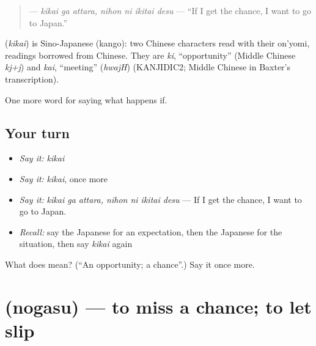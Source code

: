 \begin{quote}
\textbf{  } — \emph{kikai ga attara, nihon ni ikitai desu} — \textquotedblleft{}If I get the chance, I want to go to Japan.\textquotedblright{}
\end{quote}

\begin{cousinweb}
\textbf{} (\emph{kikai}) is Sino-Japanese (kango): two Chinese characters read with their on'yomi, readings borrowed from Chinese. They are \emph{ki}, \textquotedblleft{}opportunity\textquotedblright{} (Middle Chinese \emph{kj+j}) and \emph{kai}, \textquotedblleft{}meeting\textquotedblright{} (\emph{hwajH}) (KANJIDIC2; Middle Chinese in Baxter's transcription).
\end{cousinweb}

\begin{grammarlens}[title={What you've built}]
One more word for saying what happens if.
\end{grammarlens}

\subsection*{Your turn}
\begin{itemize}
\raggedright
  \item \emph{Say it:} \emph{kikai}
  \item \emph{Say it:} \emph{kikai}, once more
  \item \emph{Say it:} \emph{kikai ga attara, nihon ni ikitai desu} — If I get the chance, I want to go to Japan.
  \item \emph{Recall:} say the Japanese for an expectation, then the Japanese for the situation, then say \emph{kikai} again
\end{itemize}

\begin{tcolorbox}[breakable,colback=teal!4,colframe=teal!35!black,title={Before you move on}]
What does  mean? (\textquotedblleft{}An opportunity; a chance\textquotedblright{}.) Say it once more.
\end{tcolorbox}
\section[\texorpdfstring{\ja{のがす} (nogasu)}{のがす (nogasu)}]{ (nogasu) — to miss a chance; to let slip}

\label{lesson:JA-C349-nogasu}



